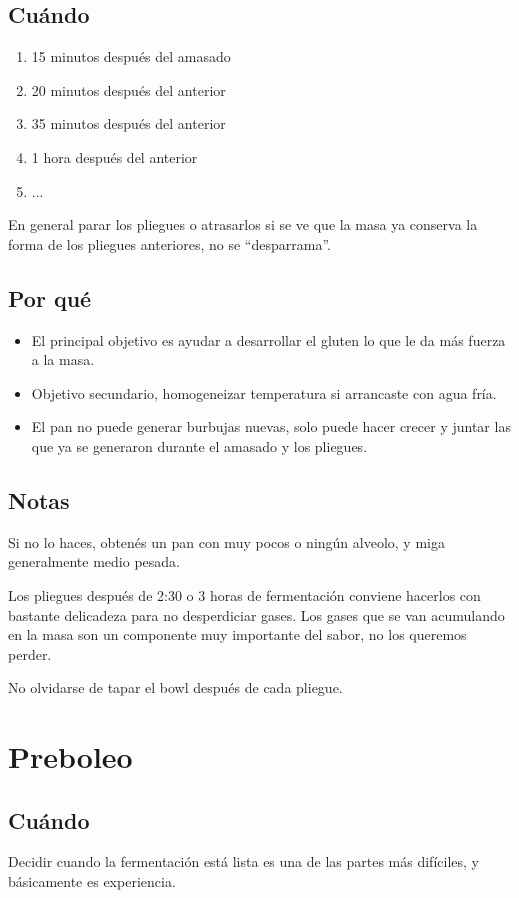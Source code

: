 \documentclass[10pt,a4paper]{article}
\begin{document}
\subsection*{Cuándo}
\begin{enumerate}
\item 15 minutos después del amasado
\item 20 minutos después del anterior
\item 35 minutos después del anterior
\item 1 hora después del anterior
\item ...
\end{enumerate}

En general parar los pliegues o atrasarlos  si se ve que la masa
ya conserva la forma de los pliegues anteriores, no se ``desparrama''.

\subsection*{Por qué}
\begin{itemize}
\item El principal objetivo es ayudar a desarrollar el gluten lo que le da más
  fuerza a la masa.
\item Objetivo secundario, homogeneizar temperatura si arrancaste con agua fría.
\item El pan no puede generar burbujas nuevas, solo puede hacer crecer y
  juntar las que ya se generaron durante el amasado y los pliegues.
\end{itemize}

\subsection*{Notas}
Si no lo haces, obtenés un pan con muy pocos o ningún alveolo, y miga
generalmente medio pesada.

Los pliegues después de 2:30 o 3 horas de fermentación conviene hacerlos con
bastante delicadeza para no desperdiciar gases. Los gases que se van acumulando
en la masa son un componente muy importante del sabor, no los queremos perder.

No olvidarse de tapar el bowl después de cada pliegue.

\section{Preboleo}
\subsection*{Cuándo}
Decidir cuando la fermentación está lista es una de las partes más difíciles, y
básicamente es experiencia.
\end{document}
